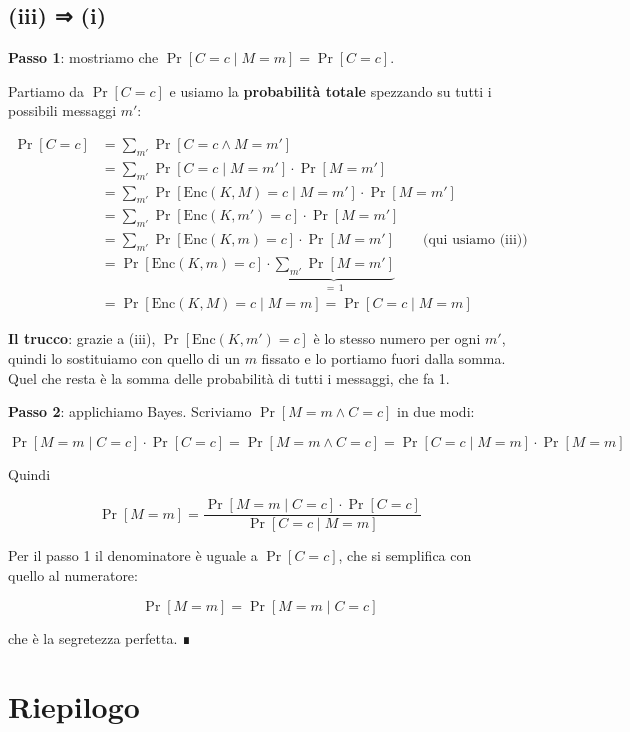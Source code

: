 \subsection{(iii) ⇒ (i)}

\textbf{Passo 1}: mostriamo che \(\Pr[C = c \mid M = m] = \Pr[C = c]\).

Partiamo da \(\Pr[C = c]\) e usiamo la \textbf{probabilità totale} spezzando su tutti i possibili messaggi \(m'\):

\[
\begin{aligned}
\Pr[C = c] &= \sum_{m'} \Pr[C = c \wedge M = m'] \\
&= \sum_{m'} \Pr[C = c \mid M = m'] \cdot \Pr[M = m'] \\
&= \sum_{m'} \Pr[\text{Enc}(K, M) = c \mid M = m'] \cdot \Pr[M = m'] \\
&= \sum_{m'} \Pr[\text{Enc}(K, m') = c] \cdot \Pr[M = m'] \\
&= \sum_{m'} \Pr[\text{Enc}(K, m) = c] \cdot \Pr[M = m'] \qquad \text{(qui usiamo (iii))} \\
&= \Pr[\text{Enc}(K, m) = c] \cdot \underbrace{\sum_{m'} \Pr[M = m']}_{=\,1} \\
&= \Pr[\text{Enc}(K, M) = c \mid M = m] = \Pr[C = c \mid M = m]
\end{aligned}
\]

\textbf{Il trucco}: grazie a (iii), \(\Pr[\text{Enc}(K, m') = c]\) è lo stesso numero per ogni \(m'\), quindi lo sostituiamo con quello di un \(m\) fissato e lo portiamo fuori dalla somma. Quel che resta è la somma delle probabilità di tutti i messaggi, che fa 1.

\textbf{Passo 2}: applichiamo Bayes. Scriviamo \(\Pr[M = m \wedge C = c]\) in due modi:

\[
\Pr[M = m \mid C = c] \cdot \Pr[C = c] = \Pr[M = m \wedge C = c] = \Pr[C = c \mid M = m] \cdot \Pr[M = m]
\]

Quindi

\[
\Pr[M = m] = \frac{\Pr[M = m \mid C = c] \cdot \Pr[C = c]}{\Pr[C = c \mid M = m]}
\]

Per il passo 1 il denominatore è uguale a \(\Pr[C = c]\), che si semplifica con quello al numeratore:

\[
\Pr[M = m] = \Pr[M = m \mid C = c]
\]

che è la segretezza perfetta. ∎

\section{Riepilogo}

